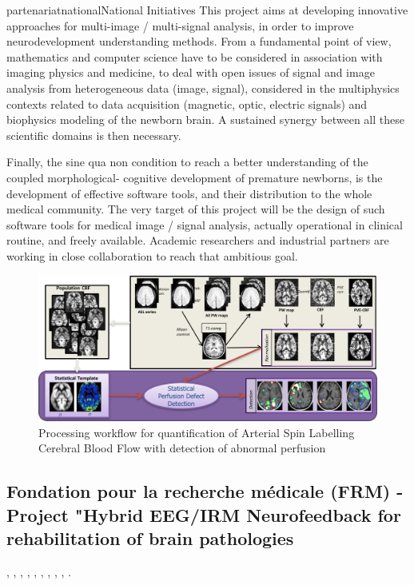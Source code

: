 \documentclass{ra2018}
\begin{document}
\begin{module}{partenariat}{national}{National Initiatives}
        This project aims at developing innovative approaches for multi-image /
        multi-signal analysis, in order to improve neurodevelopment understanding
        methods. From a fundamental point of view, mathematics and computer science
        have to be considered in association with imaging physics and medicine, to deal
        with open issues of signal and image analysis from heterogeneous data (image,
        signal), considered in the multiphysics contexts related to data acquisition
        (magnetic, optic, electric signals) and biophysics modeling of the newborn
        brain. A sustained synergy between all these scientific domains is then
        necessary.
        
        Finally, the sine qua non condition to reach a better understanding of the
        coupled morphological- cognitive development of premature newborns, is the
        development of effective software tools, and their distribution to the whole
        medical community. The very target of this project will be the design of such
        software tools for medical image / signal analysis, actually operational in
        clinical routine, and freely available. Academic researchers and industrial
        partners are working in close collaboration to reach that ambitious goal.


        \begin{figure}[htbp]
          \centerline{
            \includegraphics[width=\textwidth]{IMG/ASL_quantification}
          }
          \caption{Processing workflow for quantification of Arterial Spin Labelling Cerebral Blood Flow with detection of abnormal perfusion}
          \label{fig-ASL_quantification}
          \end{figure}
        
         \subsection{Fondation pour la recherche médicale (FRM) - Project "Hybrid EEG/IRM Neurofeedback for  rehabilitation of brain pathologies}
        \begin{participants}
        	, 
        	,
        	, 
        	,
        	, 
        	, 
        	, 
        	,
        	, 
        	.
        \end{participants}	
        

\end{module}
\end{document}
